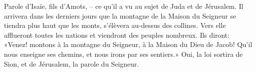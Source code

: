 Parole d’Isaïe, fils d’Amots,
	– ce qu’il a vu au sujet de Juda et de Jérusalem.
Il arrivera dans les derniers jours
	que la montagne de la Maison du Seigneur se tiendra plus haut que les monts,
	s’élèvera au-dessus des collines.
Vers elle afflueront toutes les nations et viendront des peuples nombreux.
	Ils diront: «Venez! montons à la montagne du Seigneur,
	à la Maison du Dieu de Jacob!
	Qu’il nous enseigne ses chemins, et nous irons par ses sentiers.»
Oui, la loi sortira de Sion,
	et de Jérusalem, la parole du Seigneur.
